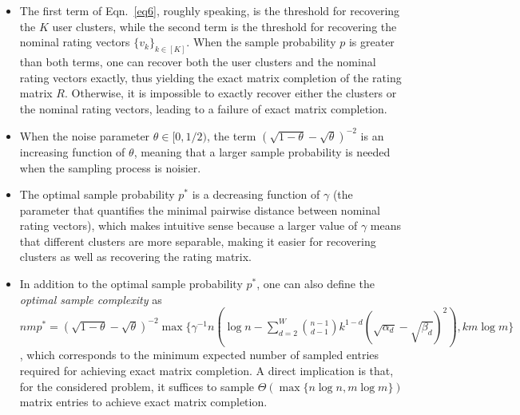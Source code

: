 \documentclass{article}
\begin{document}
\begin{itemize}[wide, labelwidth=!, labelindent=0pt]
  
\item The first term of Eqn.~\eqref{eq6}, roughly speaking, is the threshold for recovering the $K$ user clusters, while the second term  is the threshold for recovering the nominal rating vectors $\{v_k\}_{k \in [K]}$. When the sample probability $p$ is greater than both terms, one can recover both the user clusters and the nominal rating vectors exactly, thus yielding the exact matrix completion of the rating matrix $R$. Otherwise, it is impossible to exactly recover either the clusters or the nominal rating vectors, leading to a failure of exact matrix completion.

\item When the noise parameter $\theta \in [0,1/2)$, the term $(\sqrt{1-\theta} - \sqrt{\theta})^{-2}$ is an increasing function of $\theta$, meaning that a larger sample probability is needed when the sampling process is noisier.

\item The optimal sample probability $p^*$ is a decreasing function of $\gamma$ (the parameter that quantifies the minimal pairwise distance between nominal rating vectors), which makes intuitive sense because a larger value of $\gamma$ means that different clusters are more separable, making it easier for recovering clusters as well as recovering the rating matrix.   
\item In addition to the optimal sample probability $p^*$, one can also define the \emph{optimal sample complexity} as  $ nmp^* = (\sqrt{1-\theta} - \sqrt{\theta})^{-2} \max \{\gamma^{-1} n (\log n - \sum_{d=2}^{W} \binom{n-1}{d-1} k^{1-d} (\sqrt{\alpha_d}-\sqrt{\beta_d})^2 ), k m \log m \}$, which corresponds to the minimum expected number of sampled entries required for achieving exact matrix completion. A direct implication is that, for the considered problem, it suffices to sample $\Theta(\max\{n\log n, m \log m\})$ matrix entries to achieve exact matrix completion.  
\end{itemize}
\end{document}
